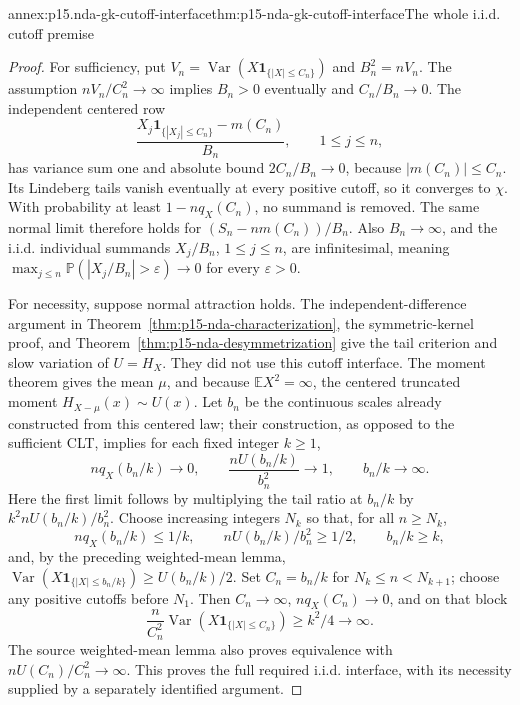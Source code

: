 \begin{annexitem}{annex:p15.nda-gk-cutoff-interface}{thm:p15-nda-gk-cutoff-interface}{The whole i.i.d. cutoff premise}
\begin{proof}
For sufficiency, put
\(V_n=\operatorname{Var}(X\mathbf1_{\{|X|\leq C_n\}})\)
and \(B_n^2=nV_n\). The assumption \(nV_n/C_n^2\to\infty\)
implies \(B_n>0\) eventually and \(C_n/B_n\to0\).
The independent centered row
\[
 \frac{X_j\mathbf1_{\{|X_j|\leq C_n\}}-m(C_n)}{B_n},
                       \qquad1\leq j\leq n,
 \]
has variance sum one and absolute bound \(2C_n/B_n\to0\),
because \(|m(C_n)|\leq C_n\).
Its Lindeberg tails vanish eventually at every positive cutoff,
so it converges to \(\chi\). With probability at least
\(1-nq_X(C_n)\), no summand is removed. The same normal limit
therefore holds for \((S_n-nm(C_n))/B_n\).
Also \(B_n\to\infty\), and the i.i.d. individual summands
\(X_j/B_n\), \(1\leq j\leq n\), are infinitesimal, meaning
\(\max_{j\leq n}\mathbb P(|X_j/B_n|>\varepsilon)\to0\)
for every \(\varepsilon>0\).

For necessity, suppose normal attraction holds.
The independent-difference argument in
Theorem~\ref{thm:p15-nda-characterization}, the symmetric-kernel
proof, and Theorem~\ref{thm:p15-nda-desymmetrization} give the
tail criterion and slow variation of \(U=H_X\).
They did not use this cutoff interface.
The moment theorem gives the mean \(\mu\), and because
\(\mathbb EX^2=\infty\), the centered truncated moment
\(H_{X-\mu}(x)\sim U(x)\).
Let \(b_n\) be the continuous scales already constructed from this
centered law; their construction, as opposed to the sufficient CLT,
implies for each fixed integer \(k\geq1\),
\[
 nq_X(b_n/k)\to0,\qquad
 \frac{nU(b_n/k)}{b_n^2}\to1,\qquad b_n/k\to\infty.
 \]
Here the first limit follows by multiplying the tail ratio at
\(b_n/k\) by \(k^2nU(b_n/k)/b_n^2\).
Choose increasing integers \(N_k\) so that, for all \(n\geq N_k\),
\[
 nq_X(b_n/k)\leq1/k,\qquad
 nU(b_n/k)/b_n^2\geq1/2,\qquad b_n/k\geq k,
 \]
and, by the preceding weighted-mean lemma,
\(\operatorname{Var}(X\mathbf1_{\{|X|\leq b_n/k\}})
\geq U(b_n/k)/2\).
Set \(C_n=b_n/k\) for \(N_k\leq n<N_{k+1}\);
choose any positive cutoffs before \(N_1\).
Then \(C_n\to\infty\), \(nq_X(C_n)\to0\), and on that block
\[
 \frac n{C_n^2}\operatorname{Var}(X\mathbf1_{\{|X|\leq C_n\}})
 \geq k^2/4\longrightarrow\infty.
 \]
The source weighted-mean lemma also proves equivalence with
\(nU(C_n)/C_n^2\to\infty\).
This proves the full required i.i.d. interface, with its
necessity supplied by a separately identified argument.
\end{proof}
\end{annexitem}

